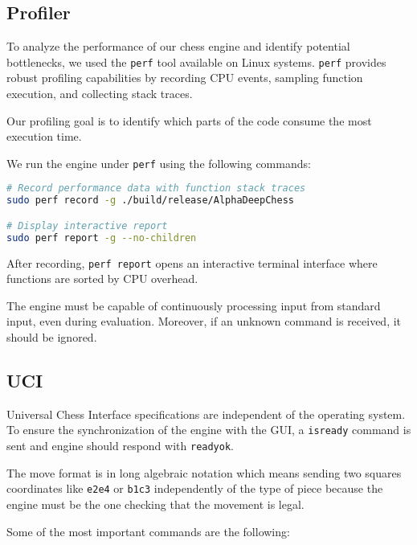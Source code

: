 \subsection{Profiler}

To analyze the performance of our chess engine and identify potential bottlenecks, we used the \texttt{perf} tool available on Linux systems. \texttt{perf} provides robust profiling capabilities by recording CPU events, sampling function execution, and collecting stack traces.

Our profiling goal is to identify which parts of the code consume the most execution time.

We run the engine under \texttt{perf} using the following commands:

\begin{lstlisting}[language=bash, caption={Profiling AlphaDeepChess with perf}]
# Record performance data with function stack traces
sudo perf record -g ./build/release/AlphaDeepChess

# Display interactive report
sudo perf report -g --no-children
\end{lstlisting}

\noindent After recording, \texttt{perf report} opens an interactive terminal interface where functions are sorted by CPU overhead.

\noindent The engine must be capable of continuously processing input from standard input, even during evaluation. Moreover, if an unknown command is received, it should be ignored.

\vspace{1em}

\subsection{UCI}

Universal Chess Interface specifications are independent of the operating system. To ensure the synchronization of the engine with the GUI, a \texttt{isready} command is sent and engine should respond with \texttt{readyok}.

\noindent The move format is in long algebraic notation which means sending two squares coordinates like \texttt{e2e4} or \texttt{b1c3} independently of the type of piece because the engine must be the one checking that the movement is legal.

\vspace{1em}

\noindent Some of the most important commands are the following:

